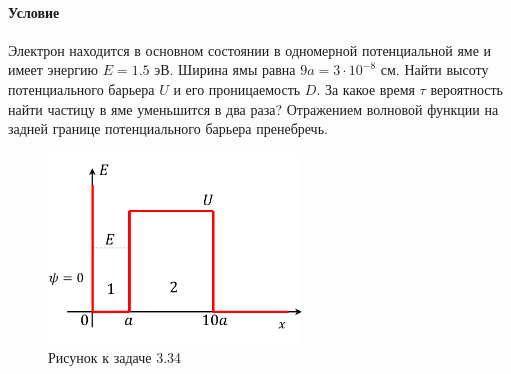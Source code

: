 \documentclass[12pt]{article}
\begin{document}
\paragraph{Условие}
Электрон находится в основном состоянии в одномерной потенциальной яме и имеет энергию $E = 1.5$ эВ. Ширина ямы равна $9a = 3 \cdot 10^{−8}$ см. Найти высоту потенциального барьера $U$ и его проницаемость $D$. За какое время $\tau$ вероятность найти частицу в яме уменьшится в два раза? Отражением волновой функции на задней границе потенциального барьера пренебречь.
\begin{figure}[h]
    \centering
    \includegraphics[width=0.6\textwidth,height=\textheight,keepaspectratio]{Seminar_04/pics/pic_05.pdf}
    \caption{Рисунок к задаче 3.34}
\end{figure}
\end{document}
